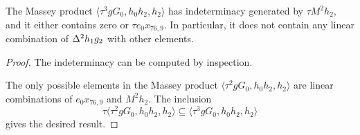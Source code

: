 \begin{lemma}
\label{lem:t^3gG0,h0h2,h2}
The Massey product $\langle \tau^3 g G_0, h_0 h_2, h_2 \rangle$
has indeterminacy generated by $\tau M^2 h_2$, and it either
contains zero or $\tau e_0 x_{76,9}$.  In particular, it does
not contain any linear combination of $\Delta^2 h_1 g_2$
with other elements.
\end{lemma}

\begin{proof}
The indeterminacy can be computed by inspection.

The only possible elements in
the Massey product $\langle \tau^2 g G_0, h_0 h_2, h_2 \rangle$
are linear combinations of $e_0 x_{76,9}$ and $M^2 h_2$.
The inclusion
\[
\tau \langle \tau^2 g G_0, h_0 h_2, h_2 \rangle \subseteq
\langle \tau^3 g G_0, h_0 h_2, h_2 \rangle
\]
gives the desired result.
\end{proof}


